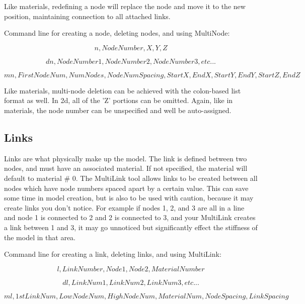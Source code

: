 \documentclass[11pt, oneside]{article}   	%
\begin{document}
Like materials, redefining a node will replace the node and move it to the new position, maintaining connection to all attached links.

Command line for creating a node, deleting nodes, and using MultiNode:

\begin{equation}
n, NodeNumber, X, Y, Z
\end{equation}

\begin{equation}
dn, NodeNumber1, NodeNumber2, NodeNumber3, etc...
\end{equation}

\begin{equation}
mn, FirstNodeNum, NumNodes, NodeNumSpacing, StartX, EndX, StartY, EndY, StartZ, EndZ
\end{equation}

Like materials, multi-node deletion can be achieved with the colon-based list format as well.  In 2d, all of the 'Z' portions can be omitted.  Again, like in materials, the node number can be unspecified and well be auto-assigned.  

\subsection{Links}
Links are what physically make up the model.  The link is defined between two nodes, and must have an associated material.  If not specified, the material will default to material \# 0.  The MultiLink tool allows links to be created between all nodes which have node numbers spaced apart by a certain value.  This can save some time in model creation, but is also to be used with caution, because it may create links you don't notice.  For example if nodes 1, 2, and 3 are all in a line and node 1 is connected to 2 and 2 is connected to 3, and your MultiLink creates a link between 1 and 3, it may go unnoticed but significantly effect the stiffness of the model in that area.  

Command line for creating a link, deleting links, and using MultiLink:

\begin{equation}
l, LinkNumber, Node1, Node2, MaterialNumber
\end{equation}

\begin{equation}
dl, LinkNum1, LinkNum2, LinkNum3, etc...
\end{equation}

\begin{equation}
ml, 1stLinkNum, LowNodeNum, HighNodeNum,  MaterialNum, NodeSpacing, LinkSpacing
\end{equation}
\end{document}
